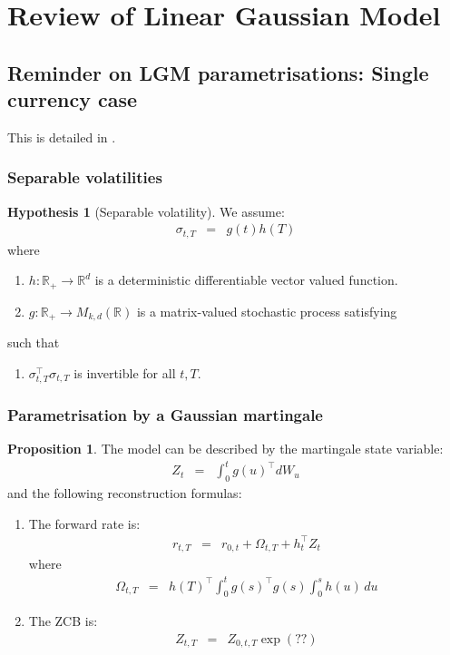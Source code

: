 \documentclass[11pt,english]{amsart}
\newcommand{\RR}{\mathbb{R}}
\theoremstyle{definition}
\newtheorem{prop}{Proposition}
\newtheorem*{hypo}{Hypothesis}
\begin{document}
\newpage%
\section{Review of Linear Gaussian Model}



\subsection{Reminder on LGM parametrisations: Single currency case}%
This is detailed in \cite[\S 10]{AndersenPiterbarg}.

\subsubsection{Separable volatilities}%


\begin{hypo}[Separable volatility]
We assume:
\begin{eqnarray}
  \sigma_{t,T}  &=& g(t)h(T)
\end{eqnarray}
where 
\begin{enumerate}
\item $h : \RR_+ \to \RR^d$ is a deterministic differentiable vector valued function.
\item $g : \RR_+ \to M_{k,d}(\RR)$ is a matrix-valued stochastic process satisfying 
\end{enumerate}
such that 
\begin{enumerate}
\item $\sigma_{t,T}^\top \sigma_{t,T}$ is invertible for all $t,T$.  
\end{enumerate}
\end{hypo}

\subsubsection{Parametrisation by a Gaussian martingale}%


\begin{prop}
The model can be described by the martingale state variable: 
\begin{eqnarray}
  Z_t &=& \int_0^t g(u)^\top dW_u 
\end{eqnarray}
and the following reconstruction formulas:
\begin{enumerate}
\item The forward rate is:
\begin{eqnarray}
  r_{t,T} &=& r_{0,t} + \Omega_{t,T} + h_t^\top Z_t 
\end{eqnarray}
where
\begin{eqnarray}
  \Omega_{t,T} &=& h(T)^\top \int_0^t g(s)^\top g(s) \int_0^s h(u) \, du
\end{eqnarray}
\item The ZCB is:
\begin{eqnarray}
  Z_{t,T} &=& Z_{0,t,T} \exp\left( ??   \right) 
\end{eqnarray}
\end{enumerate}
\end{prop}
\end{document}
